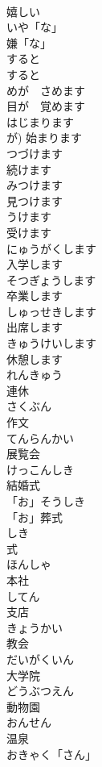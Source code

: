 \documentclass[8pt]{extreport}
\begin{document}
\begin{CJK}{UTF8}{min}
\\	嬉しい		
\\	いや「な」	
\\	嫌「な」		
\\	すると	
\\	すると		
\\	めが　さめます	
\\	目が　覚めます		
\\	はじまります	
\\	が)	始まります	
\\	つづけます	
\\	続けます	
\\	みつけます	
\\	見つけます	
\\	うけます	
\\	受けます	
\\	にゅうがくします	
\\	入学します	
\\	そつぎょうします	
\\	卒業します	
\\	しゅっせきします	
\\	出席します	
\\	きゅうけいします	
\\	休憩します		
\\	れんきゅう	
\\	連休	
\\	さくぶん	
\\	作文		
\\	てんらんかい	
\\	展覧会		
\\	けっこんしき	
\\	結婚式	
\\	「お」そうしき	
\\	「お」葬式		
\\	しき	
\\	式		
\\	ほんしゃ	
\\	本社		
\\	してん	
\\	支店		
\\	きょうかい	
\\	教会		
\\	だいがくいん	
\\	大学院	
\\	どうぶつえん	
\\	動物園		
\\	おんせん	
\\	温泉	
\\	おきゃく「さん」	

\end{CJK}
\end{document}
